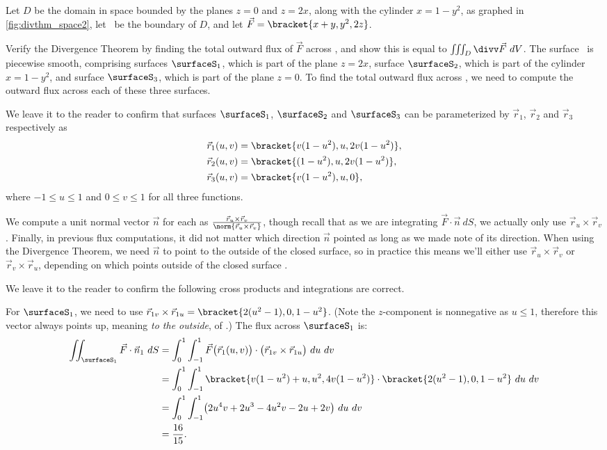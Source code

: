 \begin{example}\label{ex_divthm_space2}
Let $D$ be the domain in space bounded by the planes $z=0$ and $z=2x$, along with the cylinder $x=1-y^2$, as graphed in \autoref{fig:divthm_space2}, let \surfaceS\ be the boundary of $D$, and let $\vec F =\bracket{x+y,y^2, 2z}$. 

Verify the Divergence Theorem by finding the total outward flux of $\vec F$ across \surfaceS, and show this is equal to $\iiint_D \divv\vec F\ dV$.
\solution
The surface \surfaceS\ is piecewise smooth, comprising surfaces $\surfaceS_1$, which is part of the plane $z=2x$, surface $\surfaceS_2$, which is part of the cylinder $x=1-y^2$, and surface $\surfaceS_3$, which is part of the plane $z=0$. To find the total outward flux across \surfaceS, we need to compute the outward flux across each of these three surfaces.

We leave it to the reader to confirm that surfaces $\surfaceS_1$, $\surfaceS_2$ and $\surfaceS_3$ can be parameterized by $\vec r_1$, $\vec r_2$ and $\vec r_3$ respectively as
\begin{align*}
\vec r_1(u,v) &=\bracket{v(1-u^2), u, 2v(1-u^2)}, \\
\vec r_2(u,v) &=\bracket{(1-u^2), u, 2v(1-u^2)},\\
\vec r_3(u,v) &=\bracket{v(1-u^2), u, 0},
\end{align*}
where $-1\leq u\leq 1$ and $0\leq v\leq 1$ for all three functions.

We compute a unit normal vector $\vec n$ for each as $\frac{\vec r_u\times\vec r_v}{\norm{\vec r_u\times\vec r_v}}$, though recall that as we are integrating $\vec F\cdot \vec n\ dS$, we actually only use $\vec r_u\times\vec r_v$. Finally, in previous flux computations, it did not matter which direction $\vec n$ pointed as long as we made note of its direction. When using the Divergence Theorem, we need $\vec n$ to point to the outside of the closed surface, so in practice this means we'll either use $\vec r_u\times\vec r_v$ or $\vec r_v\times\vec r_u$, depending on which points outside of the closed surface \surfaceS.

We leave it to the reader to confirm the following cross products and integrations are correct.

For $\surfaceS_1$, we need to use $\vec r_{1v}\times\vec r_{1u} =\bracket{2(u^2-1),0,1-u^2}$. (Note the $z$-component is nonnegative as $u\leq 1$, therefore this vector always points up, meaning \emph{to the outside}, of \surfaceS.) The flux across $\surfaceS_1$ is:
\begin{align*}
	\iint_{\surfaceS_1} \vec F\cdot \vec n_1\ dS
	&= \int_0^1\int_{-1}^1 \vec F\bigl(\vec r_1(u,v)\bigr)\cdot \bigl(\vec r_{1v}\times\vec r_{1u}\bigr)\ du\ dv\\
	&= \int_0^1\int_{-1}^1\bracket{v(1-u^2)+u, u^2,4v(1-u^2)}\cdot\bracket{2(u^2-1),0,1-u^2}\ du\ dv\\
	&= \int_0^1\int_{-1}^1 \bigl(2u^4v+2u^3-4u^2v-2u+2v\bigr)\ du\ dv\\
	&= \frac{16}{15}.
\end{align*}


\end{example}
